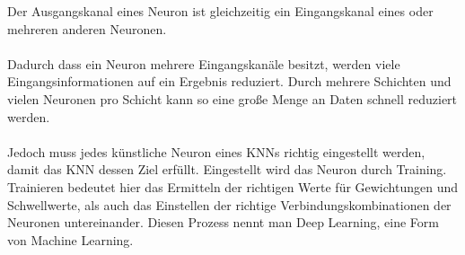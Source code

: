 \documentclass[12pt,oneside,a4paper,parskip]{scrbook}
\begin{document}
Der Ausgangskanal eines Neuron ist gleichzeitig ein Eingangskanal eines oder mehreren anderen Neuronen.
\\\\
Dadurch dass ein Neuron mehrere Eingangskanäle besitzt, werden viele Eingangsinformationen auf ein Ergebnis reduziert. Durch mehrere Schichten und vielen Neuronen pro Schicht kann so eine große Menge an Daten schnell reduziert werden.
\\\\
Jedoch muss jedes künstliche Neuron eines KNNs richtig eingestellt werden, damit das KNN dessen Ziel erfüllt. Eingestellt wird das Neuron durch Training. Trainieren bedeutet hier das Ermitteln der richtigen Werte für Gewichtungen und Schwellwerte, als auch das Einstellen der richtige Verbindungskombinationen der Neuronen untereinander. Diesen Prozess nennt man Deep Learning, eine Form von Machine Learning.
\end{document}

